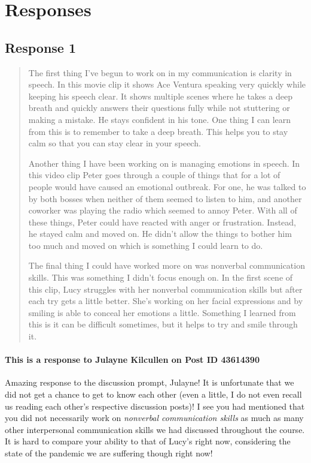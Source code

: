 
\section{Responses}
  \subsection{Response 1}
    \begin{quotation}
      The first thing I've begun to work on in my communication is clarity in
        speech. In this movie clip it shows Ace Ventura speaking very quickly
        while keeping his speech clear. It shows multiple scenes where he takes
        a deep breath and quickly answers their questions fully while not
        stuttering or making a mistake. He stays confident in his tone. One
        thing I can learn from this is to remember to take a deep breath. This
        helps you to stay calm so that you can stay clear in your speech.

      Another thing I have been working on is managing emotions in speech. In
        this video clip Peter goes through a couple of things that for a lot of
        people would have caused an emotional outbreak. For one, he was talked
        to by both bosses when neither of them seemed to listen to him, and
        another coworker was playing the radio which seemed to annoy Peter.
        With all of these things, Peter could have reacted with anger or
        frustration. Instead, he stayed calm and moved on. He didn't allow the
        things to bother him too much and moved on which is something I could
        learn to do.

      The final thing I could have worked more on was nonverbal communication
        skills. This was something I didn't focus enough on. In the first scene
        of this clip, Lucy struggles with her nonverbal communication skills
        but after each try gets a little better. She's working on her facial
        expressions and by smiling is able to conceal her emotions a little.
        Something I learned from this is it can be difficult sometimes, but it
        helps to try and smile through it.
    \end{quotation}

    \paragraph{This is a response to Julayne Kilcullen on Post ID 43614390}
      Amazing response to the discussion prompt, Julayne! It is unfortunate that
        we did not get a chance to get to know each other (even a little,
        I do not even recall us reading each other's respective discussion
        posts)! I see you had mentioned that you did not necessarily work on
        \textit{nonverbal communication skills} as much as many other
        interpersonal communication skills we had discussed throughout the
        course. It is hard to compare your ability to that of Lucy's right now,
        considering the state of the pandemic we are suffering though right now!


